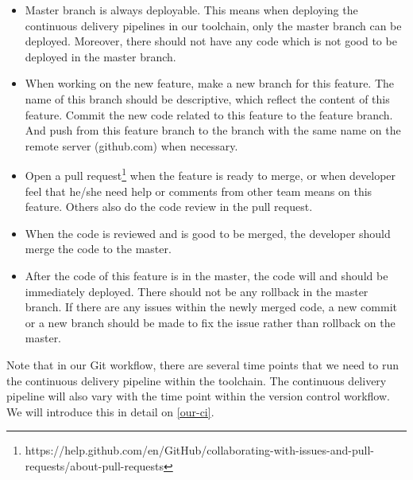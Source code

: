 \begin{itemize}
\item Master branch is always deployable. This means when deploying the continuous delivery pipelines in our toolchain, only the master branch can be deployed. Moreover, there should not have any code which is not good to be deployed in the master branch.
\item When working on the new feature, make a new branch for this feature. The name of this branch should be descriptive, which reflect the content of this feature. Commit the new code related to this feature to the feature branch. And push from this feature branch to the branch with the same name on the remote server (github.com) when necessary.
\item Open a pull request\footnote{https://help.github.com/en/GitHub/collaborating-with-issues-and-pull-requests/about-pull-requests} when the feature is ready to merge, or when developer feel that he/she need help or comments from other team means on this feature. Others also do the code review in the pull request.
\item When the code is reviewed and is good to be merged, the developer should merge the code to the master.
\item After the code of this feature is in the master, the code will and should be immediately deployed. There should not be any rollback in the master branch. If there are any issues within the newly merged code, a new commit or a new branch should be made to fix the issue rather than rollback on the master.
\end{itemize}
\par
Note that in our Git workflow, there are several time points that we need to run the continuous delivery pipeline within the toolchain. The continuous delivery pipeline will also vary with the time point within the version control workflow. We will introduce this in detail on \ref{our-ci}.
